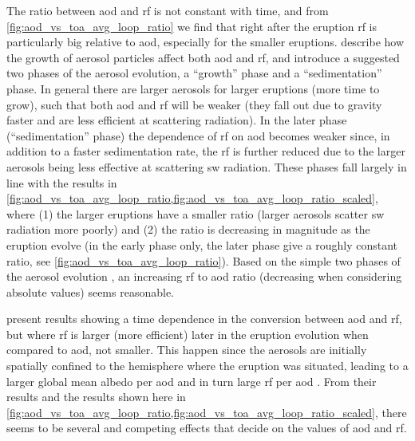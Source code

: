 \documentclass{ametsocV5}
\begin{document}
The ratio between \ac{aod} and \ac{rf} is not constant with time, and from
\cref{fig:aod_vs_toa_avg_loop_ratio} we find that right after the eruption \ac{rf} is
particularly big relative to \ac{aod}, especially for the smaller eruptions.
\citet[][see their sections 3.1.2, 3.2.2]{marshall2019} describe how the growth of
aerosol particles affect both \ac{aod} and \ac{rf}, and introduce a suggested two phases
of the aerosol evolution, a ``growth'' phase and a ``sedimentation'' phase. In general
there are larger aerosols for larger eruptions (more time to grow), such that both
\ac{aod} and \ac{rf} will be weaker (they fall out due to gravity faster and are less
efficient at scattering radiation).
In the later phase (``sedimentation'' phase) the dependence of \ac{rf} on \ac{aod}
becomes weaker since, in addition to a faster sedimentation rate, the \ac{rf} is further
reduced due to the larger aerosols being less effective at scattering \ac{sw} radiation.
These phases fall largely in line with the results in
\cref{fig:aod_vs_toa_avg_loop_ratio,fig:aod_vs_toa_avg_loop_ratio_scaled}, where (1) the
larger eruptions have a smaller ratio (larger aerosols scatter \ac{sw} radiation more
poorly) and (2) the ratio is decreasing in magnitude as the eruption evolve (in the
early phase only, the later phase give a roughly constant ratio, see
\cref{fig:aod_vs_toa_avg_loop_ratio}). Based on the simple two phases of the aerosol
evolution \citep{marshall2019}, an increasing \ac{rf} to \ac{aod} ratio (decreasing when
considering absolute values) seems reasonable.

\citet[][their Fig.\ 1c,d]{marshall2020} present results showing a time dependence in
the conversion between \ac{aod} and \ac{rf}, but where \ac{rf} is larger (more
efficient) later in the eruption evolution when compared to \ac{aod}, not smaller. This
happen since the aerosols are initially spatially confined to the hemisphere where the
eruption was situated, leading to a larger global mean albedo per \ac{aod} and in turn
large \ac{rf} per \ac{aod} \citep{marshall2020}. From their results and the results
shown here in \cref{fig:aod_vs_toa_avg_loop_ratio,fig:aod_vs_toa_avg_loop_ratio_scaled},
there seems to be several and competing effects that decide on the values of \ac{aod}
and \ac{rf}.

\end{document}
